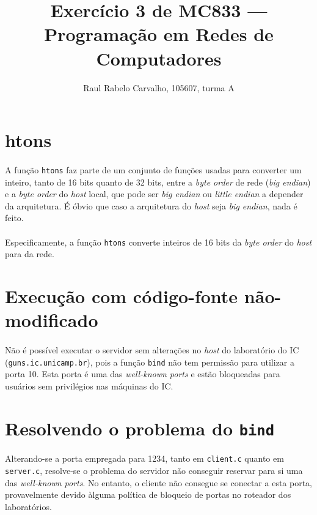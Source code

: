 \documentclass[a4paper,10pt,oneside,final,titlepage,onecolumn]{article}
\title{Exercício 3 de MC833 --- Programação em Redes de Computadores}
\author{Raul Rabelo Carvalho, 105607, turma A}
\begin{document}
\maketitle



\section{htons}
\paragraph{}A função \verb|htons| faz parte de um conjunto de funções usadas para converter um inteiro, tanto de 16 bits quanto de 32 bits, entre a \emph{byte order} de rede (\emph{big endian}) e a \emph{byte order} do \emph{host} local, que pode ser \emph{big endian} ou \emph{little endian} a depender da arquitetura. É óbvio que caso a arquitetura do \emph{host} seja \emph{big endian}, nada é feito.
\paragraph{}Especificamente, a função \verb|htons| converte inteiros de 16 bits da \emph{byte order} do \emph{host} para da rede.



\section{Execução com código-fonte não-modificado}
\paragraph{}Não é possível executar o servidor sem alterações no \emph{host} do laboratório do IC (\verb|guns.ic.unicamp.br|), pois a função \verb|bind| não tem permissão para utilizar a porta 10. Esta porta é uma das \emph{well-known ports} e estão bloqueadas para usuários sem privilégios nas máquinas do IC.



\section{Resolvendo o problema do \verb|bind|}
\paragraph{}Alterando-se a porta empregada para 1234, tanto em \verb|client.c| quanto em \verb|server.c|, resolve-se o problema do servidor não conseguir reservar para si uma das \emph{well-known ports}. No entanto, o cliente não consegue se conectar a esta porta, provavelmente devido àlguma política de bloqueio de portas no roteador dos laboratórios.
\end{document}
